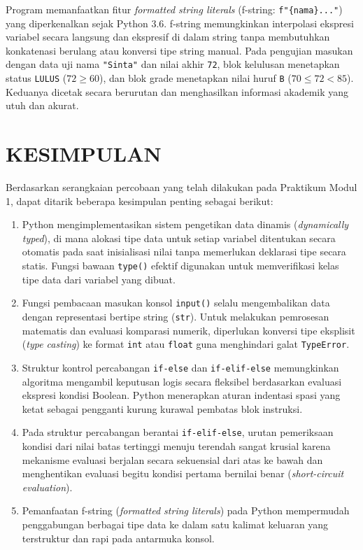 \documentclass[12pt,a4paper]{article}
\begin{document}
Program memanfaatkan fitur \textit{formatted string literals} (f-string: \texttt{f"\{nama\}..."}) yang diperkenalkan sejak Python 3.6. f-string memungkinkan interpolasi ekspresi variabel secara langsung dan ekspresif di dalam string tanpa membutuhkan konkatenasi berulang atau konversi tipe string manual. Pada pengujian masukan dengan data uji nama \texttt{"Sinta"} dan nilai akhir \texttt{72}, blok kelulusan menetapkan status \texttt{LULUS} ($72 \ge 60$), dan blok grade menetapkan nilai huruf \texttt{B} ($70 \le 72 < 85$). Keduanya dicetak secara berurutan dan menghasilkan informasi akademik yang utuh dan akurat.

\section{KESIMPULAN}
Berdasarkan serangkaian percobaan yang telah dilakukan pada Praktikum Modul 1, dapat ditarik beberapa kesimpulan penting sebagai berikut:
\begin{enumerate}
    \item Python mengimplementasikan sistem pengetikan data dinamis (\textit{dynamically typed}), di mana alokasi tipe data untuk setiap variabel ditentukan secara otomatis pada saat inisialisasi nilai tanpa memerlukan deklarasi tipe secara statis. Fungsi bawaan \texttt{type()} efektif digunakan untuk memverifikasi kelas tipe data dari variabel yang dibuat.
    \item Fungsi pembacaan masukan konsol \texttt{input()} selalu mengembalikan data dengan representasi bertipe string (\texttt{str}). Untuk melakukan pemrosesan matematis dan evaluasi komparasi numerik, diperlukan konversi tipe eksplisit (\textit{type casting}) ke format \texttt{int} atau \texttt{float} guna menghindari galat \texttt{TypeError}.
    \item Struktur kontrol percabangan \texttt{if-else} dan \texttt{if-elif-else} memungkinkan algoritma mengambil keputusan logis secara fleksibel berdasarkan evaluasi ekspresi kondisi Boolean. Python menerapkan aturan indentasi spasi yang ketat sebagai pengganti kurung kurawal pembatas blok instruksi.
    \item Pada struktur percabangan berantai \texttt{if-elif-else}, urutan pemeriksaan kondisi dari nilai batas tertinggi menuju terendah sangat krusial karena mekanisme evaluasi berjalan secara sekuensial dari atas ke bawah dan menghentikan evaluasi begitu kondisi pertama bernilai benar (\textit{short-circuit evaluation}).
    \item Pemanfaatan f-string (\textit{formatted string literals}) pada Python mempermudah penggabungan berbagai tipe data ke dalam satu kalimat keluaran yang terstruktur dan rapi pada antarmuka konsol.
\end{enumerate}
\end{document}
